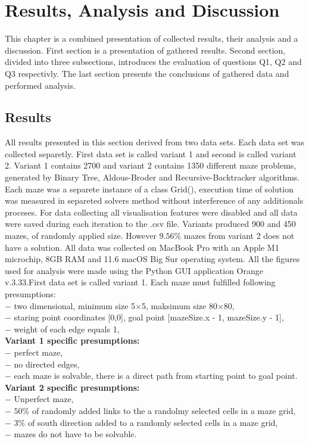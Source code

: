 \chapter{Results, Analysis and Discussion}\label{cha:Results Analysis and Discussion}
This chapter is a combined presentation of collected results, their analysis and a discussion. First section is a presentation of gathered results. 
Second section, divided into three subsections, introduces the evaluation of questions Q1, Q2 and Q3 respectivly. The last section presents the 
conclusions of gathered data and performed analysis. 
\section{Results}
All results presented in this section derived from two data sets. Each data set was collected separetly. First data set is called variant 1 and second is 
called variant 2. Variant 1 contains 2700 and  variant 2 contains 1350 different maze problems, generated by Binary Tree, Aldous-Broder and Recursive-Backtracker
algorithms. Each maze was a separete instance of a class Grid(), execution time of solution was measured in separeted solvers method without interference of
any additionals proceses. For data collecting all visualisation features were disabled and all data were saved during each iteration to the .csv file.
Variants produced  900 and 450 mazes, of randomly applied size. However $9.56\%$ mazes from variant 2 does not have a solution. All data was collected on
MacBook Pro with an Apple M1 microchip, 8GB RAM and 11.6 macOS Big Sur operating system. All the figures used for analysis were made using the Python GUI application Orange v.3.33.First data set is called variant 1.
Each maze must fulfilled following presumptions:\\
$-$ two dimensional, minimum size 5$\times$5, maksimum size 80$\times$80,\\
$-$ staring point coordinates [0,0], goal point [mazeSize.x - 1, mazeSize.y - 1],\\
$-$ weight of each edge equals 1,\\
\textbf{Variant 1 specific presumptions: }\\
$-$ perfect maze,\\
$-$ no directed edges,\\
$-$ each maze is solvable, there is a direct path from starting point to goal point.\\
\textbf{Variant 2 specific presumptions: }\\
$-$ Unperfect maze,\\
$-$ $50\%$ of randomly added links to the a randolmy selected cells in a maze grid,\\
$-$ $3\%$ of south direction added to a randomly selected cells in a maze grid,\\
$-$ mazes do not have to be solvable.\\
